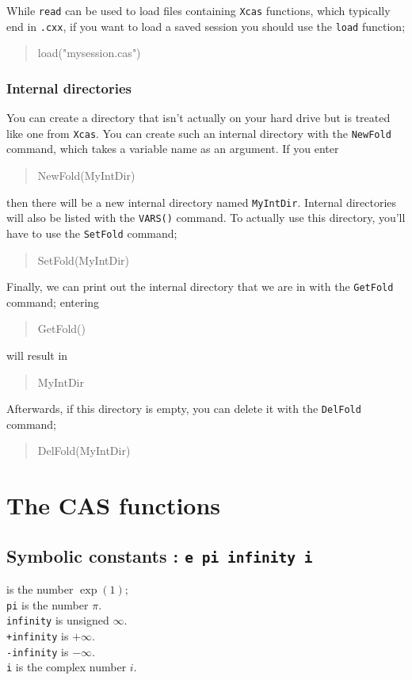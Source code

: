 \documentclass[a4paper,11pt]{book}
\newenvironment{giaccmd}
{\begin{quote}\ttfamily}
{\end{quote}}
\begin{document}
While \texttt{read} can be used to load files containing \texttt{Xcas}
functions, which typically end in \texttt{.cxx}, if you want to load a
saved session you should use the \texttt{load} function;
\begin{giaccmd}
  load("mysession.cas")
\end{giaccmd}

\subsection{Internal directories}

You can create a directory that isn't actually on your hard drive but
is treated like one from \texttt{Xcas}.  You can create such an
internal directory with the \texttt{NewFold} command,
which takes a variable name as an argument. If you enter
\begin{giaccmd}
  NewFold(MyIntDir)
\end{giaccmd}
then there will be a new internal directory named \texttt{MyIntDir}.
Internal directories will also be listed with the
\texttt{VARS()}
command. To actually use this directory, you'll have to use the
\texttt{SetFold} command;
\begin{giaccmd}
  SetFold(MyIntDir)
\end{giaccmd}
Finally, we can print out the internal directory that we are in with
the \texttt{GetFold} command; entering
\begin{giaccmd}
  GetFold()
\end{giaccmd}
will result in
\begin{giaccmd}
  MyIntDir
\end{giaccmd}
Afterwards, if this directory is empty, you can delete it with the
\texttt{DelFold} command;
\begin{giaccmd}
  DelFold(MyIntDir)
\end{giaccmd}


\chapter{The CAS functions}\label{sec:cas}

\section{Symbolic constants : {\tt e pi infinity i}}
 is the number $\exp(1)$;\\ 
{\tt pi} is the number $\pi$.\\
{\tt infinity} is unsigned $\infty$.\\
{\tt +infinity} is $+\infty$.\\
{\tt -infinity} is $-\infty$.\\
{\tt i} is the complex number $i$.
\end{document}
